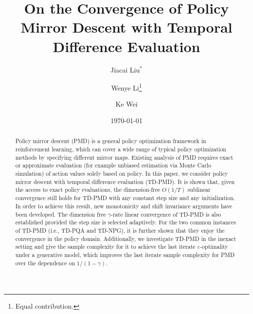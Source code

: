\documentclass[10pt]{article}
\title{On the Convergence of Policy Mirror Descent with Temporal Difference Evaluation}
\theoremstyle{plain}
\theoremstyle{definition}
\begin{document}
\author{Jiacai Liu$^{*}$}
\author{Wenye Li\thanks{Equal contribution.}}
\author{Ke Wei}
\date{\today}
\maketitle


\begin{abstract}
  Policy mirror descent (PMD) is a general policy optimization framework in reinforcement learning, which can cover a wide range of typical policy optimization methods by specifying different mirror maps. Existing analysis of PMD requires exact or approximate evaluation (for example unbiased estimation via Monte Carlo simulation) of action values solely based on  policy. In this paper, we consider policy mirror descent with temporal difference evaluation (TD-PMD). It is shown that, given the access to exact policy evaluations,  the dimension-free $O(1/T)$  sublinear convergence  still holds for TD-PMD with any constant step size and any initialization. {In order to achieve this result,  new monotonicity and shift invariance
arguments have been developed.} The dimension free $\gamma$-rate linear convergence of TD-PMD is also established provided the step size is selected adaptively. {For the two common instances of TD-PMD (i.e., TD-PQA and TD-NPG), it is further shown that they enjoy the convergence in the policy domain}. Additionally, we investigate TD-PMD in  the inexact setting and give the sample complexity for it to achieve the last iterate $\varepsilon$-optimality under a generative model, which improves the last iterate sample complexity for PMD over the dependence on $1/(1-\gamma)$. 
\end{abstract}
\end{document}
